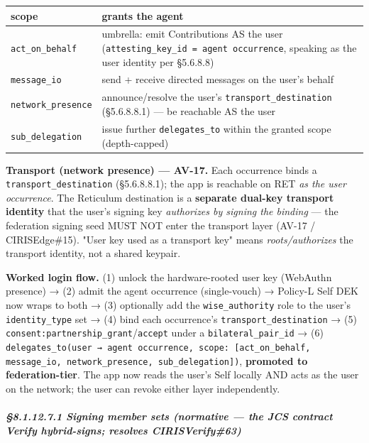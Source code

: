 \documentclass[10pt]{article}
\begin{document}
{\footnotesize
\begin{longtable}{|p{8.0cm}|p{8.0cm}|}\hline
\textbf{scope} & \textbf{grants the agent} \\ \hline\endhead
\texttt{act\_on\_behalf} & umbrella: emit Contributions AS the user (\texttt{attesting\_key\_id = agent occurrence}, speaking as the user identity per §5.6.8.8) \\ \hline
\texttt{message\_io} & send + receive directed messages on the user's behalf \\ \hline
\texttt{network\_presence} & announce/resolve the user's \texttt{transport\_destination} (§5.6.8.8.1) — be reachable AS the user \\ \hline
\texttt{sub\_delegation} & issue further \texttt{delegates\_to} within the granted scope (depth-capped) \\ \hline
\end{longtable}}


\textbf{Transport (network presence) — AV-17.} Each occurrence binds a \texttt{transport\_destination} (§5.6.8.8.1); the app is reachable on RET \textit{as the user occurrence}. The Reticulum destination is a \textbf{separate dual-key transport identity} that the user's signing key \textit{authorizes by signing the binding} — the federation signing seed MUST NOT enter the transport layer (AV-17 / CIRISEdge\#15). "User key used as a transport key" means \textit{roots/authorizes} the transport identity, not a shared keypair.


\textbf{Worked login flow.} (1) unlock the hardware-rooted user key (WebAuthn presence) → (2) admit the agent occurrence (single-vouch) → Policy-L Self DEK now wraps to both → (3) optionally add the \texttt{wise\_authority} role to the user's \texttt{identity\_type} set → (4) bind each occurrence's \texttt{transport\_destination} → (5) \texttt{consent:partnership\_grant}/\texttt{accept} under a \texttt{bilateral\_pair\_id} → (6) \texttt{delegates\_to(user → agent occurrence, scope: [act\_on\_behalf, message\_io, network\_presence, sub\_delegation])}, \textbf{promoted to federation-tier}. The app now reads the user's Self locally AND acts as the user on the network; the user can revoke either layer independently.


\subparagraph{§8.1.12.7.1 Signing member sets (normative — the JCS contract Verify hybrid-signs; resolves CIRISVerify\#63)}\mbox{}\\
\end{document}
